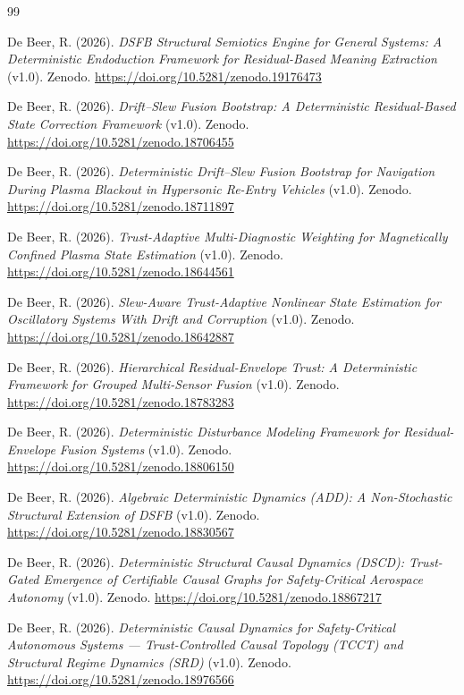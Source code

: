 \documentclass[11pt,letterpaper]{article}
\theoremstyle{scresult}
\begin{document}
\clearpage
\begin{thebibliography}{99}

De Beer, R. (2026).
\textit{DSFB Structural Semiotics Engine for General Systems:
A Deterministic Endoduction Framework for Residual-Based Meaning Extraction}
(v1.0). Zenodo. \url{https://doi.org/10.5281/zenodo.19176473}

De Beer, R. (2026).
\textit{Drift--Slew Fusion Bootstrap: A Deterministic Residual-Based State
Correction Framework} (v1.0). Zenodo.
\url{https://doi.org/10.5281/zenodo.18706455}

De Beer, R. (2026).
\textit{Deterministic Drift--Slew Fusion Bootstrap for Navigation During Plasma
Blackout in Hypersonic Re-Entry Vehicles} (v1.0). Zenodo.
\url{https://doi.org/10.5281/zenodo.18711897}

De Beer, R. (2026).
\textit{Trust-Adaptive Multi-Diagnostic Weighting for Magnetically Confined
Plasma State Estimation} (v1.0). Zenodo.
\url{https://doi.org/10.5281/zenodo.18644561}

De Beer, R. (2026).
\textit{Slew-Aware Trust-Adaptive Nonlinear State Estimation for Oscillatory
Systems With Drift and Corruption} (v1.0). Zenodo.
\url{https://doi.org/10.5281/zenodo.18642887}

De Beer, R. (2026).
\textit{Hierarchical Residual-Envelope Trust: A Deterministic Framework for
Grouped Multi-Sensor Fusion} (v1.0). Zenodo.
\url{https://doi.org/10.5281/zenodo.18783283}

De Beer, R. (2026).
\textit{Deterministic Disturbance Modeling Framework for Residual-Envelope
Fusion Systems} (v1.0). Zenodo.
\url{https://doi.org/10.5281/zenodo.18806150}

De Beer, R. (2026).
\textit{Algebraic Deterministic Dynamics (ADD): A Non-Stochastic Structural
Extension of DSFB} (v1.0). Zenodo.
\url{https://doi.org/10.5281/zenodo.18830567}

De Beer, R. (2026).
\textit{Deterministic Structural Causal Dynamics (DSCD): Trust-Gated Emergence
of Certifiable Causal Graphs for Safety-Critical Aerospace Autonomy} (v1.0).
Zenodo. \url{https://doi.org/10.5281/zenodo.18867217}

De Beer, R. (2026).
\textit{Deterministic Causal Dynamics for Safety-Critical Autonomous Systems ---
Trust-Controlled Causal Topology (TCCT) and Structural Regime Dynamics (SRD)}
(v1.0). Zenodo. \url{https://doi.org/10.5281/zenodo.18976566}


\end{thebibliography}
\end{document}
